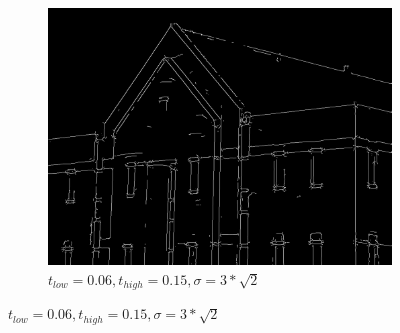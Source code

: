 \documentclass[a4paper]{article}
\begin{document}
\begin{figure}[h]
\begin{subfigure}[b]{0.3\textwidth}
        \end{subfigure}
        \begin{subfigure}[b]{0.3\textwidth}
                \centering
                \includegraphics[width=\textwidth]{q2-house-canny-0150063rt2}
                \caption{$t_{low}=0.06, t_{high}=0.15, \sigma=3*\sqrt{2}$}
                \label{fig:4c}
                
        \end{subfigure}
        

\end{figure}
\end{document}
